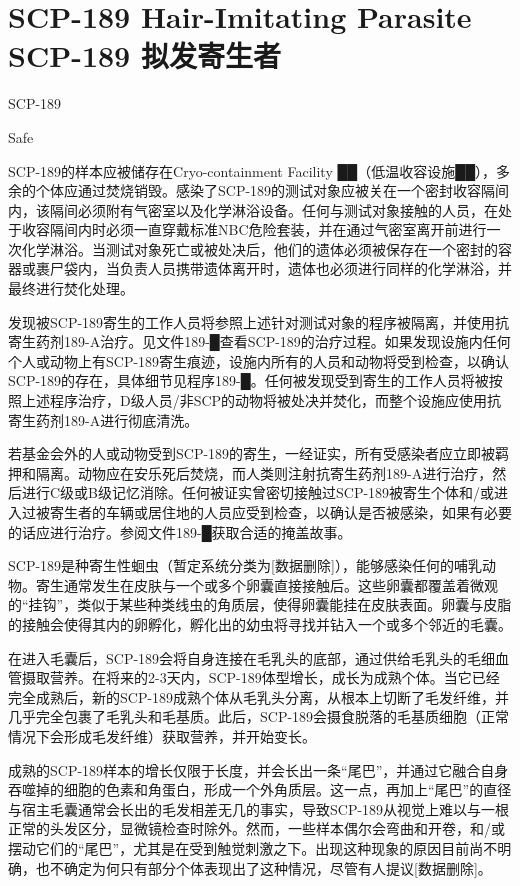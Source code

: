 \chapter[SCP-189 拟发寄生者]{
    SCP-189 Hair-Imitating Parasite\\
    SCP-189 拟发寄生者
}

\label{chap:SCP-189}

SCP-189

Safe

SCP-189的样本应被储存在Cryo-containment Facility ██（低温收容设施██），多余的个体应通过焚烧销毁。感染了SCP-189的测试对象应被关在一个密封收容隔间内，该隔间必须附有气密室以及化学淋浴设备。任何与测试对象接触的人员，在处于收容隔间内时必须一直穿戴标准NBC危险套装，并在通过气密室离开前进行一次化学淋浴。当测试对象死亡或被处决后，他们的遗体必须被保存在一个密封的容器或裹尸袋内，当负责人员携带遗体离开时，遗体也必须进行同样的化学淋浴，并最终进行焚化处理。

发现被SCP-189寄生的工作人员将参照上述针对测试对象的程序被隔离，并使用抗寄生药剂189-A治疗。见文件189-█查看SCP-189的治疗过程。如果发现设施内任何个人或动物上有SCP-189寄生痕迹，设施内所有的人员和动物将受到检查，以确认SCP-189的存在，具体细节见程序189-█。任何被发现受到寄生的工作人员将被按照上述程序治疗，D级人员\slash 非SCP的动物将被处决并焚化，而整个设施应使用抗寄生药剂189-A进行彻底清洗。

若基金会外的人或动物受到SCP-189的寄生，一经证实，所有受感染者应立即被羁押和隔离。动物应在安乐死后焚烧，而人类则注射抗寄生药剂189-A进行治疗，然后进行C级或B级记忆消除。任何被证实曾密切接触过SCP-189被寄生个体和\slash 或进入过被寄生者的车辆或居住地的人员应受到检查，以确认是否被感染，如果有必要的话应进行治疗。参阅文件189-█获取合适的掩盖故事。

SCP-189是种寄生性蛔虫（暂定系统分类为{[}数据删除]），能够感染任何的哺乳动物。寄生通常发生在皮肤与一个或多个卵囊直接接触后。这些卵囊都覆盖着微观的“挂钩”，类似于某些种类线虫的角质层，使得卵囊能挂在皮肤表面。卵囊与皮脂的接触会使得其内的卵孵化，孵化出的幼虫将寻找并钻入一个或多个邻近的毛囊。

在进入毛囊后，SCP-189会将自身连接在毛乳头的底部，通过供给毛乳头的毛细血管摄取营养。在将来的2-3天内，SCP-189体型增长，成长为成熟个体。当它已经完全成熟后，新的SCP-189成熟个体从毛乳头分离，从根本上切断了毛发纤维，并几乎完全包裹了毛乳头和毛基质。此后，SCP-189会摄食脱落的毛基质细胞（正常情况下会形成毛发纤维）获取营养，并开始变长。

成熟的SCP-189样本的增长仅限于长度，并会长出一条“尾巴”，并通过它融合自身吞噬掉的细胞的色素和角蛋白，形成一个外角质层。这一点，再加上“尾巴”的直径与宿主毛囊通常会长出的毛发相差无几的事实，导致SCP-189从视觉上难以与一根正常的头发区分，显微镜检查时除外。然而，一些样本偶尔会弯曲和开卷，和\slash 或摆动它们的“尾巴”，尤其是在受到触觉刺激之下。出现这种现象的原因目前尚不明确，也不确定为何只有部分个体表现出了这种情况，尽管有人提议{[}数据删除]。

